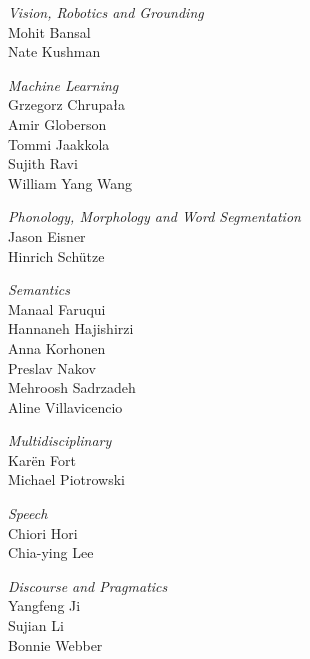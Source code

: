 \emph{Vision, Robotics and Grounding} \\
\hspace*{0.2in} Mohit Bansal \\
\hspace*{0.2in} Nate Kushman

\emph{Machine Learning} \\
\hspace*{0.2in} Grzegorz Chrupała \\
\hspace*{0.2in} Amir Globerson \\
\hspace*{0.2in} Tommi Jaakkola \\
\hspace*{0.2in} Sujith Ravi \\
\hspace*{0.2in} William Yang Wang

\emph{Phonology, Morphology and Word Segmentation} \\
\hspace*{0.2in} Jason Eisner \\
\hspace*{0.2in} Hinrich Schütze

\emph{Semantics} \\
\hspace*{0.2in} Manaal Faruqui \\
\hspace*{0.2in} Hannaneh Hajishirzi \\
\hspace*{0.2in} Anna Korhonen \\
\hspace*{0.2in} Preslav Nakov \\
\hspace*{0.2in} Mehroosh Sadrzadeh \\
\hspace*{0.2in} Aline Villavicencio

\emph{Multidisciplinary} \\
\hspace*{0.2in} Karën Fort \\
\hspace*{0.2in} Michael Piotrowski

\emph{Speech} \\
\hspace*{0.2in} Chiori Hori \\
\hspace*{0.2in} Chia-ying Lee

\emph{Discourse and Pragmatics} \\
\hspace*{0.2in} Yangfeng Ji \\
\hspace*{0.2in} Sujian Li \\
\hspace*{0.2in} Bonnie Webber

